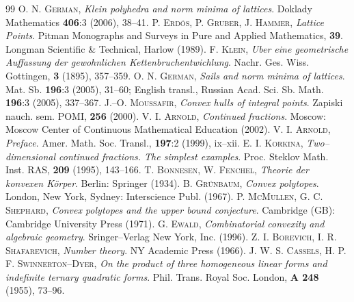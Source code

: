 \documentclass[11pt]{article}
\theoremstyle{definition}
\theoremstyle{remark}
\theoremstyle{plain}
\begin{document}
  \begin{thebibliography}{99}
     \textsc{O. N. German},
        \textit{Klein polyhedra and norm minima of lattices}.
        Doklady Mathematics {\bf 406}:3 (2006), 38--41.
     \textsc{P. Erd\"{o}s, P. Gruber, J. Hammer},
        \textit{Lattice Points}.
        Pitman Monographs and Surveys in Pure and Applied
        Mathematics, {\bf 39}. Longman Scientific \& Technical, Harlow (1989).
     \textsc{F. Klein},
        \textit{Uber eine geometrische Auffassung der gewohnlichen Kettenbruchentwichlung}.
        Nachr. Ges. Wiss. Gottingen, {\bf 3} (1895), 357--359.
     \textsc{O. N. German},
        \textit{Sails and norm minima of lattices}.
        Mat. Sb. {\bf 196}:3 (2005), 31--60;
        English transl., Russian Acad. Sci. Sb. Math. {\bf 196}:3 (2005), 337--367.
     \textsc{J.--O. Moussafir},
        \textit{Convex hulls of integral points}.
        Zapiski nauch. sem. POMI, {\bf 256} (2000).
     \textsc{V. I. Arnold},
        \textit{Continued fractions}.
        Moscow: Moscow Center of Continuous Mathematical Education (2002).
     \textsc{V. I. Arnold},
        \textit{Preface}.
        Amer. Math. Soc. Transl., {\bf 197}:2 (1999), ix--xii.
     \textsc{E. I. Korkina},
        \textit{Two--dimensional continued fractions. The simplest examples}.
        Proc. Steklov Math. Inst. RAS, {\bf 209} (1995), 143--166.
     \textsc{T. Bonnesen, W. Fenchel},
        \textit{Theorie der konvexen K\"orper}.
        Berlin: Springer (1934).
     \textsc{B. Gr\"unbaum},
        \textit{Convex polytopes}.
        London, New York, Sydney: Interscience Publ. (1967).
     \textsc{P. McMullen, G. C. Shephard},
        \textit{Convex polytopes and the upper bound conjecture}.
        Cambridge (GB): Cambridge University Press (1971).
     \textsc{G. Ewald},
        \textit{Combinatorial convexity and algebraic geometry}.
        Sringer--Verlag New York, Inc. (1996).
     \textsc{Z. I. Borevich, I. R. Shafarevich},
        \textit{Number theory}.
        NY Academic Press (1966).
     \textsc{J. W. S. Cassels, H. P. F. Swinnerton--Dyer},
        \textit{On the product of three homogeneous linear forms and indefinite ternary
        quadratic forms}.
        Phil. Trans. Royal Soc. London, {\bf A 248} (1955), 73--96.

\end{thebibliography}
\end{document}
